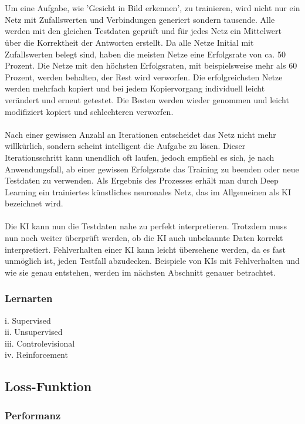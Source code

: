 \documentclass[12pt,oneside,a4paper,parskip]{scrbook}
\begin{document}
\\\\
Um eine Aufgabe, wie 'Gesicht in Bild erkennen', zu trainieren, wird nicht nur ein Netz mit Zufallswerten und Verbindungen generiert sondern tausende. Alle werden mit den gleichen Testdaten geprüft und für jedes Netz ein Mittelwert über die Korrektheit der Antworten erstellt. Da alle Netze Initial mit Zufallswerten belegt sind, haben die meisten Netze eine Erfolgsrate von ca. 50 Prozent. Die Netze mit den höchsten Erfolgsraten, mit beispielsweise mehr als 60 Prozent, werden behalten, der Rest wird verworfen. Die erfolgreichsten Netze werden mehrfach kopiert und bei jedem Kopiervorgang individuell leicht verändert und erneut getestet. Die Besten werden wieder genommen und leicht modifiziert kopiert und schlechteren verworfen. 
\\\\
Nach einer gewissen Anzahl an Iterationen entscheidet das Netz nicht mehr willkürlich, sondern scheint intelligent die Aufgabe zu lösen. Dieser Iterationsschritt kann unendlich oft laufen, jedoch empfiehl es sich, je nach Anwendungsfall, ab einer gewissen Erfolgsrate das Training zu beenden oder neue Testdaten zu verwenden. Als Ergebnis des Prozesses erhält man durch Deep Learning ein trainiertes künstliches neuronales Netz, das im Allgemeinen als KI bezeichnet wird.
\\\\
Die KI kann nun die Testdaten nahe zu perfekt interpretieren. Trotzdem muss nun noch weiter überprüft werden, ob die KI auch unbekannte Daten korrekt interpretiert. Fehlverhalten einer KI kann leicht übersehene werden, da es fast unmöglich ist, jeden Testfall abzudecken. Beispiele von KIs mit Fehlverhalten und wie sie genau entstehen, werden im nächsten Abschnitt genauer betrachtet.
\subsubsection{Lernarten}
i.	Supervised
\\ii.	Unsupervised
\\iii.	Controlevisional
\\iv.	Reinforcement

\subsection{Loss-Funktion}
\subsubsection{Performanz}
\end{document}
